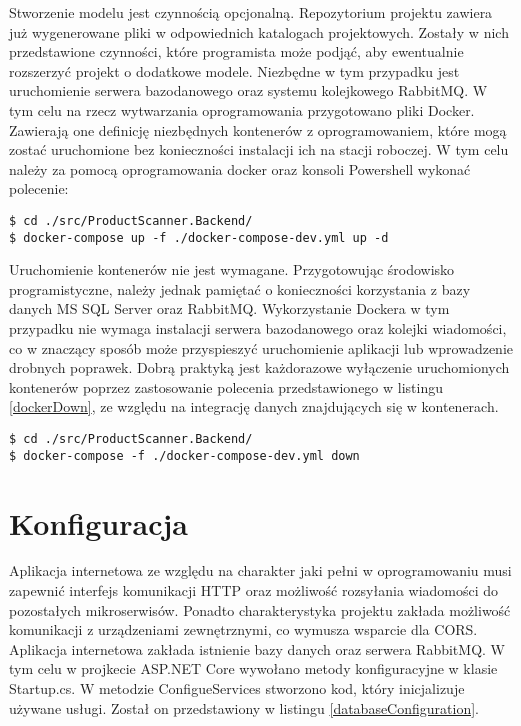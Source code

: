 Stworzenie modelu jest czynnością opcjonalną. Repozytorium projektu zawiera już wygenerowane pliki w odpowiednich katalogach projektowych. Zostały w nich  przedstawione czynności, które programista może podjąć, aby ewentualnie rozszerzyć projekt o dodatkowe modele. Niezbędne w tym przypadku jest uruchomienie serwera bazodanowego oraz systemu kolejkowego RabbitMQ. W tym celu na rzecz wytwarzania oprogramowania przygotowano pliki Docker. Zawierają one definicję niezbędnych kontenerów z oprogramowaniem, które mogą zostać uruchomione bez konieczności instalacji ich na stacji roboczej. W tym celu należy za pomocą oprogramowania docker oraz konsoli Powershell wykonać polecenie:

\begin{lstlisting}[caption={Uruchomienie kontenerów docker.} ]
$ cd ./src/ProductScanner.Backend/
$ docker-compose up -f ./docker-compose-dev.yml up -d
\end{lstlisting}

Uruchomienie kontenerów nie jest wymagane. Przygotowując środowisko programistyczne, należy jednak pamiętać o konieczności korzystania z bazy danych MS SQL Server oraz RabbitMQ. Wykorzystanie Dockera w tym przypadku nie wymaga instalacji serwera bazodanowego oraz kolejki wiadomości, co w znaczący sposób może przyspieszyć uruchomienie aplikacji lub wprowadzenie drobnych poprawek. Dobrą praktyką jest każdorazowe wyłączenie uruchomionych kontenerów poprzez zastosowanie polecenia przedstawionego w listingu \ref{dockerDown}, ze względu na integrację danych znajdujących się w kontenerach. 


\begin{lstlisting}[caption={Komenda docker-compose down.},label={dockerDown} ]
$ cd ./src/ProductScanner.Backend/
$ docker-compose -f ./docker-compose-dev.yml down
\end{lstlisting}


\section{Konfiguracja}

Aplikacja internetowa ze względu na charakter jaki pełni w oprogramowaniu musi zapewnić interfejs komunikacji HTTP oraz możliwość rozsyłania wiadomości do pozostałych mikroserwisów. Ponadto charakterystyka projektu zakłada możliwość komunikacji z urządzeniami zewnętrznymi, co wymusza wsparcie dla CORS. Aplikacja internetowa zakłada istnienie bazy danych oraz serwera RabbitMQ. W tym celu w projkecie ASP.NET Core wywołano metody konfiguracyjne w klasie Startup.cs. W metodzie ConfigueServices stworzono kod, który inicjalizuje używane usługi. Został on przedstawiony w listingu \ref{databaseConfiguration}. 
\newpage

